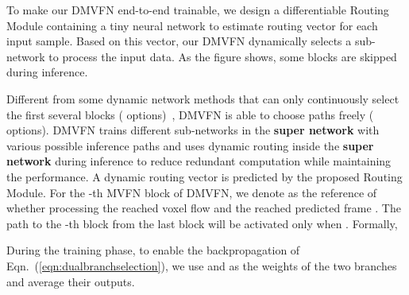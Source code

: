 \documentclass[10pt,twocolumn,letterpaper]{article}
\begin{document}
To make our DMVFN end-to-end trainable, we design a differentiable Routing Module containing a tiny neural network to estimate routing vector  for each input sample. Based on this vector, our DMVFN dynamically selects a sub-network to process the input data. As the figure shows, some blocks are skipped during inference.



Different from some dynamic network methods that can only continuously select the first several blocks ( options)~\cite{branchynet,bolukbasi2017adaptive}, DMVFN is able to choose paths freely ( options). DMVFN trains different sub-networks in the \textbf{super network} with various possible inference paths and uses dynamic routing inside the \textbf{super network} during inference to reduce redundant computation while maintaining the performance. A dynamic routing vector  is predicted by the proposed Routing Module. For the -th MVFN block of DMVFN, we denote  as the reference of whether processing the reached voxel flow  and the reached predicted frame . The path  to the -th block from the last block will be activated only when . Formally, 

During the training phase, to enable the backpropagation of Eqn.~(\ref{eqn:dualbranchselection}), we use  and  as the weights of the two branches and average their outputs.
\end{document}
